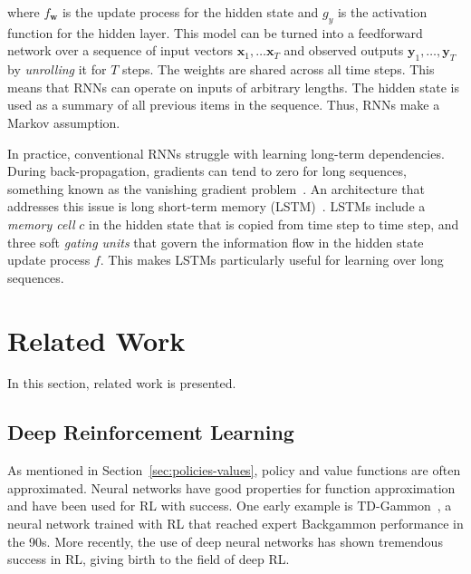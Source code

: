 where \(f_\mathbf{w}\) is the update process for the hidden state and \(g_y\) is the activation function for the hidden layer.
This model can be turned into a feedforward network over a sequence of input vectors \(\mathbf{x}_1, \dots \mathbf{x}_T\) and observed outputs \(\mathbf{y}_1, \dots, \mathbf{y}_T\) by \textit{unrolling} it for \(T\) steps. The weights are shared across all time steps. This means that RNNs can operate on inputs of arbitrary lengths.
The hidden state is used as a summary of all previous items in the sequence.
Thus, RNNs make a Markov assumption.~\cite{russell_artificial_2021}

In practice, conventional RNNs struggle with learning long-term dependencies.
During back-propagation, gradients can tend to zero for long sequences, something known as the vanishing gradient problem~\cite{goodfellow_deep_2016}.
An architecture that addresses this issue is long short-term memory (LSTM)~\cite{hochreiter_schmidhuber_lstm_1997}.
LSTMs include a \textit{memory cell} \(c\) in the hidden state that is copied from time step to time step, and three soft \textit{gating units} that govern the information flow in the hidden state update process \(f\). This makes LSTMs particularly useful for learning over long sequences.

\section{Related Work}

In this section, related work is presented.

\subsection{Deep Reinforcement Learning}



As mentioned in Section~\ref{sec:policies-values}, policy and value functions are often approximated.
Neural networks have good properties for function approximation and have been used for RL with success.
One early example is TD-Gammon~\cite{tesauro1995tdgammon}, a neural network trained with RL that reached expert Backgammon performance in the 90s.
More recently, the use of deep neural networks has shown tremendous success in RL, giving birth to the field of deep RL.


\cite{tesauro1995tdgammon} %

